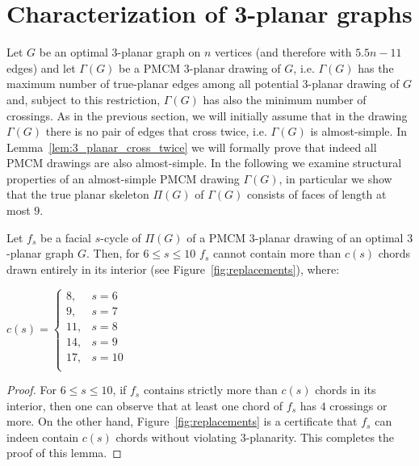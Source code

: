 \section{Characterization of 3-planar graphs}
\label{sec:3planar}

Let $G$ be an optimal $3$-planar graph on $n$ vertices (and therefore with $5.5n-11$ edges) and let $\Gamma(G)$ be a PMCM $3$-planar drawing of $G$, i.e. $\Gamma(G)$ has the maximum number of true-planar edges among all potential $3$-planar drawing of $G$ and, subject to this restriction, $\Gamma(G)$ has also the minimum number of crossings. 
As in the previous section, we will initially assume that in the drawing $\Gamma(G)$ there is no pair of edges that cross twice, i.e. $\Gamma(G)$ is almost-simple. In Lemma~\ref{lem:3_planar_cross_twice} we will formally prove that indeed all PMCM drawings are also almost-simple. In the following we examine structural properties of an almost-simple PMCM drawing $\Gamma(G)$, in particular we show  that the true planar skeleton $\Pi(G)$ of $\Gamma(G)$ consists of faces of length at most $9$. 

\begin{lemma}\label{lem:no-of-edges}
Let $f_s$ be a facial $s$-cycle of $\Pi(G)$ of a PMCM $3$-planar drawing of an optimal $3$-planar graph $G$. Then, for $6\leq s\leq 10$ $f_s$ cannot contain more than $c(s)$ chords drawn entirely in its interior (see Figure~\ref{fig:replacements}), where:

$c(s)=\left\{
\begin{array}{ll}
8,  &s=6\\
9,  &s=7\\
11, &s=8\\
14, &s=9\\
17, &s=10\\
\end{array}
\right.
$
\end{lemma}
\begin{proof}
For $6\leq s\leq 10$, if $f_s$ contains strictly more than $c(s)$ chords in its interior, then one can observe that at least one chord of $f_s$ has $4$ crossings or more. On the other hand, Figure~\ref{fig:replacements} is a certificate that $f_s$ can indeen contain $c(s)$ chords without violating $3$-planarity. This completes the proof of this lemma.
\end{proof}

